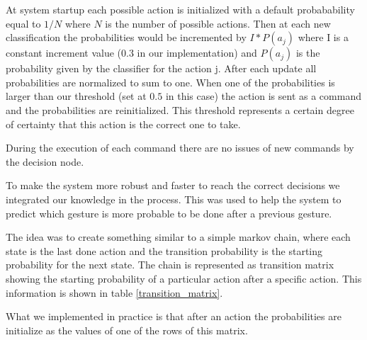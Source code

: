 At system startup each possible action is initialized with a default probabability equal to $1/N$ where $N$ is the number of possible actions.
Then at each new classification the probabilities would be incremented by $I*P(a_j)$ where I is a constant increment value ($0.3$ in our implementation) and $P(a_j)$ is the probability given by the classifier for the action j.
After each update all probabilities are normalized to sum to one.
When one of the probabilities is larger than our threshold (set at $0.5$ in this case) the action is sent as a command and the probabilities are reinitialized. This threshold represents a certain degree of certainty that this action is the correct one to take.

During the execution of each command there are no issues of new commands by the decision node.

To make the system more robust and faster to reach the correct decisions we integrated our knowledge in the process. This was used to help the system to predict which gesture is more probable to be done after a previous gesture.

The idea was to create something similar to a simple markov chain, where each state is the last done action and the transition
probability is the starting probability for the next state.
The chain is represented as transition matrix showing the starting probability of a particular action after a specific action. This information is shown in table \ref{transition_matrix}.


What we implemented in practice is that after an action the probabilities are initialize as the values of one of the rows of this matrix.
